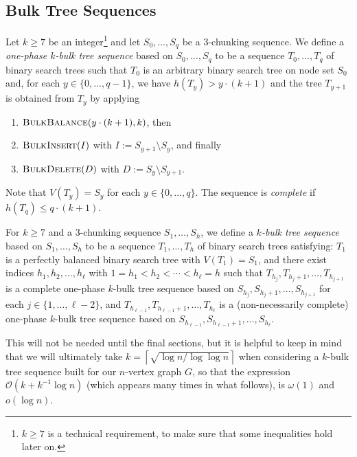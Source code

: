 \documentclass[kpfonts]{patmorin}
\newcommand{\Oh}{\mathcal{O}}
\let\ge\geqslant
\let\leq\leqslant
\let\geq\geqslant
\begin{document}
\subsection{Bulk Tree Sequences}



Let $k\ge 7$ be an integer\footnote{$k \geq 7$ is a technical requirement, to make sure that some inequalities hold later on.} and let $S_0,\ldots,S_q$ be a $3$-chunking sequence.
We define a \emph{one-phase $k$-bulk tree sequence} based on $S_0,\ldots,S_q$ to be a sequence $T_0, \dots, T_{q}$ of binary search trees such that $T_0$ is an arbitrary binary search tree on node set $S_0$ and,  for each $y\in \{0, \dots, q-1\}$, we have $h(T_y)>y\cdot(k+1)$ and
the tree $T_{y+1}$ is obtained from $T_y$ by applying
\begin{enumerate}[label={(\roman*)}, ref={\roman*}, noitemsep]
    \item $\textsc{BulkBalance}(y\cdot(k+1),k)$, then
    \item $\textsc{BulkInsert}(I)$ with $I:=S_{y+1} \setminus S_{y}$, and finally
    \item $\textsc{BulkDelete}(D)$ with $D:=S_{y} \setminus S_{y+1}$.
\end{enumerate}
Note that $V(T_y)=S_y$ for each $y \in \{0, \dots, q\}$.
The sequence is \emph{complete} if $h(T_q)\leq q\cdot(k+1)$.

For $k\geq 7$ and a $3$-chunking sequence $S_1,\ldots,S_h$, we define
a \emph{$k$-bulk tree sequence} based on $S_1,\ldots,S_h$ to be a sequence $T_1, \dots, T_h$ of binary search trees satisfying:
$T_1$ is a perfectly balanced binary search tree with $V(T_1)=S_1$, and
there exist indices $h_1,h_2,\ldots,h_{\ell}$ with $1=h_1 < h_2 < \cdots <h_{\ell} = h$  such that $T_{h_j}, T_{h_j+1},\ldots,T_{h_{j+1}}$ is a complete one-phase $k$-bulk tree sequence based on $S_{h_j}, S_{h_j+1},\ldots,S_{h_{j+1}}$
for each $j\in\{1,\ldots,\ell-2\}$, and $T_{h_{\ell-1}}, T_{h_{\ell-1}+1},\ldots,T_{h_{\ell}}$ is a (non-necessarily complete) one-phase $k$-bulk tree sequence based on $S_{h_{\ell-1}},S_{h_{\ell-1}+1},\ldots,S_{h_{\ell}}$.


This will not be needed until the final sections, but it is helpful to keep in mind that we will ultimately take $k=\left\lceil\sqrt{\log n / \log \log n}\right\rceil$ when considering a $k$-bulk tree sequence built for our $n$-vertex graph $G$, so that the expression $\Oh(k+k^{-1}\log n)$ (which appears many times in what follows), is $\omega(1)$ and $o(\log n)$.
\end{document}
